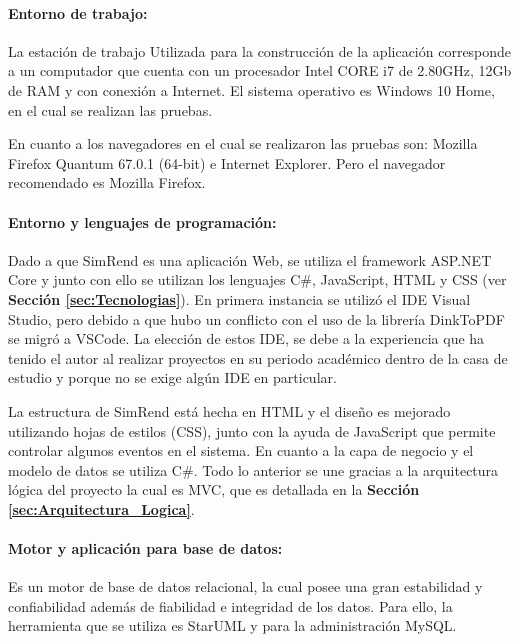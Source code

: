\paragraph{Entorno de trabajo: } La estación de trabajo Utilizada para la construcción de la aplicación corresponde a un computador que cuenta con un procesador Intel CORE i7 de 2.80GHz, 12Gb de RAM y con conexión a Internet. El sistema operativo es Windows 10 Home, en el cual se realizan las pruebas.

En cuanto a los navegadores en el cual se realizaron las pruebas son: Mozilla Firefox Quantum 67.0.1 (64-bit) e Internet Explorer. Pero el navegador recomendado es Mozilla Firefox.

\paragraph{Entorno y lenguajes de programación: } Dado a que SimRend es una aplicación Web, se utiliza el framework ASP.NET Core y junto con ello se utilizan los lenguajes C\#, JavaScript, HTML y CSS (ver \textbf{Sección \ref{sec:Tecnologias}}). En primera instancia se utilizó el IDE Visual Studio, pero debido a que hubo un conflicto con el uso de la librería DinkToPDF se migró a VSCode. La elección de estos IDE, se debe a la experiencia que ha tenido el autor al realizar proyectos en su periodo académico dentro de la casa de estudio y porque no se exige algún IDE en particular.

La estructura de SimRend está hecha en HTML y el diseño es mejorado utilizando hojas de estilos (CSS), junto con la ayuda de JavaScript que permite controlar algunos eventos en el sistema. En cuanto a la capa de negocio y el modelo de datos se utiliza C\#. Todo lo anterior se une gracias a la arquitectura lógica del proyecto la cual es MVC, que es detallada en la \textbf{Sección \ref{sec:Arquitectura_Logica}}.

\paragraph{Motor y aplicación para base de datos: } Es un motor de base de datos relacional, la cual posee una gran estabilidad y confiabilidad además de fiabilidad e integridad de los datos. Para ello, la herramienta que se utiliza es StarUML y para la administración MySQL.
